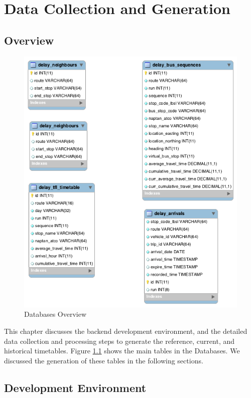 \chapter{Data Collection and Generation}
\label{ch:data_generation}
\section{Overview}
\begin{figure}
\centering
\includegraphics[width=\textwidth]{figures/uml.png}
\caption{\label{fig:uml} Databases Overview}
\end{figure}

\par This chapter discusses the backend development environment, and the detailed data collection and processing steps to generate the reference, current, and historical timetables. Figure \ref{fig:uml} shows the main tables in the Databases. We discussed the generation of these tables in the following sections.

\section{Development Environment}
